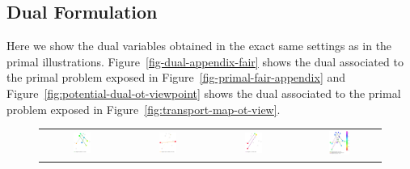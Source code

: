 \newpage
\subsection{Dual Formulation}
Here we show the dual variables obtained in the exact same settings as in the primal illustrations. Figure~\ref{fig-dual-appendix-fair} shows the dual associated to the primal problem exposed in Figure~\ref{fig-primal-fair-appendix} and  Figure~\ref{fig:potential-dual-ot-viewpoint} shows the dual associated to the primal problem exposed in Figure~\ref{fig:transport-map-ot-view}.

\begin{figure}[h!]
\begin{tabular}{@{}c@{}c@{}c@{}c@{}}
\includegraphics[width=0.23\textwidth]{figures/dual_MOT_1_neg_norm.pdf}&
\includegraphics[width=0.23\textwidth]{figures/dual_MOT_2_neg_norm.pdf}&
\includegraphics[width=0.23\textwidth]{figures/dual_MOT_3_neg_norm.pdf}&
\includegraphics[width=0.268\textwidth]{figures/dual_MOT_1_2_3_neg_norm.pdf}

\end{tabular}
\end{figure}
